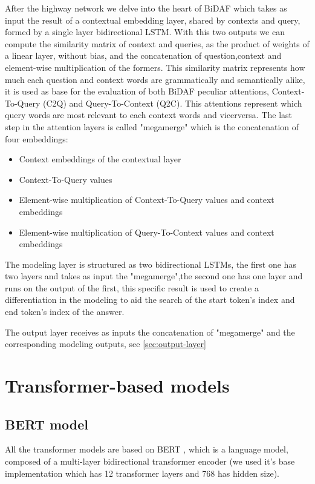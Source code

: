 \documentclass[a4paper,10pt]{report}
\begin{document}
After the highway network we delve into the heart of BiDAF which takes as input the result of a contextual embedding layer, shared by contexts and query, formed by a single layer bidirectional LSTM. With this two outputs we can compute the similarity matrix of context and queries, as the product of weights of a linear layer, without bias, and the concatenation of question,context and element-wise multiplication of the formers. This similarity matrix represents how much each question and context words are grammatically and semantically alike, it is used as base for the evaluation of both BiDAF peculiar attentions, Context-To-Query (C2Q) and Query-To-Context (Q2C). This attentions represent which query words are most relevant to each context words and vicerversa.
The last step in the attention layers is called "megamerge" which is the concatenation of four embeddings:
\begin{itemize}
  \item Context embeddings of the contextual layer
  \item Context-To-Query values
  \item Element-wise multiplication of Context-To-Query values and context embeddings
  \item Element-wise multiplication of Query-To-Context values and context embeddings
\end{itemize}

The modeling layer is structured as two bidirectional LSTMs, the first one has two layers and takes as input the "megamerge",the second one has one layer and runs on the output of the first, this specific result is used to create a differentiation in the modeling to aid the search of the start token's index and end token's index of the answer.

The output layer receives as inputs the concatenation of "megamerge" and the corresponding modeling outputs, see \ref{sec:output-layer}

\section{Transformer-based models}\label{sec:transformer-models}
\subsection{BERT model}\label{subsec:bert-model}
All the transformer models are based on BERT \cite{bert}, which is a language model, composed of a multi-layer bidirectional transformer encoder \cite{transformers} (we used it's base implementation which has 12 transformer layers and 768 has hidden size).
\end{document}
